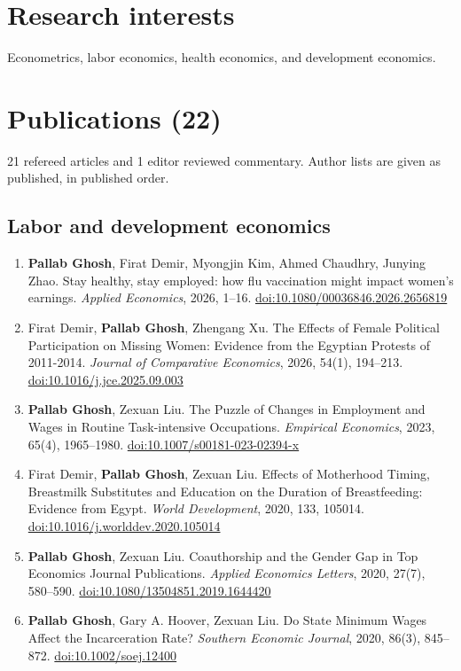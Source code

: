 \documentclass[10.5pt]{article}
\begin{document}
\section{Research interests}
Econometrics, labor economics, health economics, and development economics.
\section{Publications (22)}
{\small 21 refereed articles and 1 editor reviewed commentary. Author lists are given as published, in published order.}\par
\subsection{Labor and development economics}
\begin{enumerate}[start=1]
\item \textbf{Pallab Ghosh}, Firat Demir, Myongjin Kim, Ahmed Chaudhry, Junying Zhao. Stay healthy, stay employed: how flu vaccination might impact women's earnings. \emph{Applied Economics}, 2026, 1--16. \href{https://doi.org/10.1080/00036846.2026.2656819}{doi:10.1080/00036846.2026.2656819}
\item Firat Demir, \textbf{Pallab Ghosh}, Zhengang Xu. The Effects of Female Political Participation on Missing Women: Evidence from the Egyptian Protests of 2011-2014. \emph{Journal of Comparative Economics}, 2026, 54(1), 194--213. \href{https://doi.org/10.1016/j.jce.2025.09.003}{doi:10.1016/j.jce.2025.09.003}
\item \textbf{Pallab Ghosh}, Zexuan Liu. The Puzzle of Changes in Employment and Wages in Routine Task-intensive Occupations. \emph{Empirical Economics}, 2023, 65(4), 1965--1980. \href{https://doi.org/10.1007/s00181-023-02394-x}{doi:10.1007/s00181-023-02394-x}
\item Firat Demir, \textbf{Pallab Ghosh}, Zexuan Liu. Effects of Motherhood Timing, Breastmilk Substitutes and Education on the Duration of Breastfeeding: Evidence from Egypt. \emph{World Development}, 2020, 133, 105014. \href{https://doi.org/10.1016/j.worlddev.2020.105014}{doi:10.1016/j.worlddev.2020.105014}
\item \textbf{Pallab Ghosh}, Zexuan Liu. Coauthorship and the Gender Gap in Top Economics Journal Publications. \emph{Applied Economics Letters}, 2020, 27(7), 580--590. \href{https://doi.org/10.1080/13504851.2019.1644420}{doi:10.1080/13504851.2019.1644420}
\item \textbf{Pallab Ghosh}, Gary A. Hoover, Zexuan Liu. Do State Minimum Wages Affect the Incarceration Rate? \emph{Southern Economic Journal}, 2020, 86(3), 845--872. \href{https://doi.org/10.1002/soej.12400}{doi:10.1002/soej.12400}

\end{enumerate}
\end{document}
